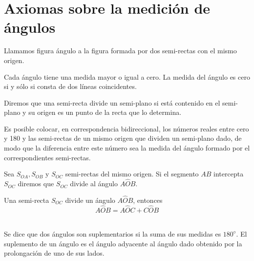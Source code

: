 \chapter{Axiomas sobre la medición de ángulos}

    \begin{def.}
	Llamamos figura ángulo a la figura formada por dos semi-rectas con el mismo origen.\\
    \end{def.}

\begin{axioma}
    Cada ángulo tiene una medida mayor o igual a cero. La medida del ángulo es cero si y sólo si consta de dos líneas coincidentes.
\end{axioma}

    \begin{def.}
	Diremos que una semi-recta divide un semi-plano si está contenido en el semi-plano y su origen es un punto de la recta que lo determina.\\
    \end{def.}

\begin{axioma}
    Es posible colocar, en correspondencia bidireccional, los números reales entre cero y 180 y las semi-rectas de un mismo origen que dividen un semi-plano dado, de modo que la diferencia entre este número sea la medida del ángulo formado por el correspondientes semi-rectas.\\
\end{axioma}

    \begin{def.}
	Sea $S_{OA}, S_{OB}$ y $S_{OC}$ semi-rectas del mismo origen. Si el segmento $AB$ intercepta $S_{OC}$ diremos que $S_{OC}$ divide al ángulo $A\widehat{O}B$.\\
    \end{def.}

\begin{axioma}
    Una semi-recta $S_{OC}$ divide un ángulo $A\widehat{O}B$, entonces $$A\widehat{O}B=A\widehat{O}C + C\widehat{O}B$$\\
\end{axioma}


    \begin{def.}
	Se dice que dos ángulos son suplementarios si la suma de sus medidas es $180^{◦}$. El suplemento de un ángulo es el ángulo adyacente al ángulo  dado obtenido por la prolongación de uno de sus lados.\\
    \end{def.}
